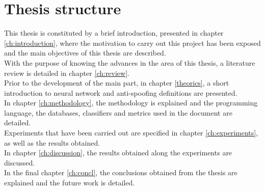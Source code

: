 \section{Thesis structure}
This thesis is constituted by a brief introduction, presented in chapter \ref{ch:introduction}, where the motivation to carry out this project has been exposed and the main objectives of this thesis are described.\\

With the purpose of knowing the advances in the area of this thesis, a literature review is detailed in chapter \ref{ch:review}.\\

Prior to the development of the main part, in chapter \ref{theorics}, a short introduction to neural network and anti-spoofing definitions are presented.\\

In chapter \ref{ch:methodology}, the methodology is explained and the programming language, the databases, classifiers and metrics used in the document are detailed.\\

Experiments that have been carried out are specified in chapter \ref{ch:experiments}, as well as the results obtained.\\

In chapter \ref{ch:discussion}, the results obtained along the experiments are discussed.\\

In the final chapter \ref{ch:concl}, the conclusions obtained from the thesis are explained and the future work is detailed.
